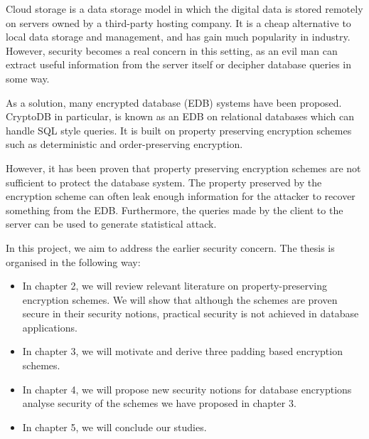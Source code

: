 Cloud storage is a data storage model in which the digital data is stored remotely on servers owned by a third-party hosting company. It is a cheap alternative to local data storage and management, and has gain much popularity in industry. However, security becomes a real concern in this setting, as an evil man can extract useful information from the server itself or decipher database queries in some way.

As a solution, many encrypted database (EDB) systems have been proposed. CryptoDB \cite{Popa:2011:CPC:2043556.2043566} in particular, is known as an EDB on relational databases which can handle SQL style queries. It is built on property preserving encryption schemes such as deterministic and order-preserving encryption.

However, it has been proven that property preserving encryption schemes are not sufficient to protect the database system. The property preserved by the encryption scheme can often leak enough information for the attacker to recover something from the EDB. Furthermore, the queries made by the client to the server can be used to generate statistical attack.

In this project, we aim to address the earlier security concern. The thesis is organised in the following way:
\begin{itemize}
\item In chapter 2, we will review relevant literature on property-preserving encryption schemes. We will show that although the schemes are proven secure in their security notions, practical security is not achieved in database applications.
\item In chapter 3, we will motivate and derive three padding based encryption schemes.
\item In chapter 4, we will propose new security notions for database encryptions analyse security of the schemes we have proposed in chapter 3.
\item In chapter 5, we will conclude our studies.
\end{itemize}
